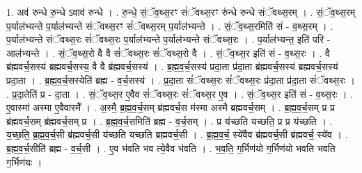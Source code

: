 \documentclass[17pt]{extarticle}
\begin{document}
1. अव॑ रुन्धे रु॒न्धे ऽवाव॑ रुन्धे । . रु॒न्धे॒ सं॒ॅव॒थ्स॒रꣳ सं॑ॅवथ्स॒रꣳ रु॑न्धे रुन्धे संॅवथ्स॒रम् । . सं॒ॅव॒थ्स॒रम् प॒र्याल॑भ्यन्ते प॒र्याल॑भ्यन्ते संॅवथ्स॒रꣳ सं॑ॅवथ्स॒रम् प॒र्याल॑भ्यन्ते । . सं॒ॅव॒थ्स॒रमिति॑ सं - व॒थ्स॒रम् । . प॒र्याल॑भ्यन्ते संॅवथ्स॒रः सं॑ॅवथ्स॒रः प॒र्याल॑भ्यन्ते प॒र्याल॑भ्यन्ते संॅवथ्स॒रः । . प॒र्याल॑भ्यन्त॒ इति॑ परि - आल॑भ्यन्ते । . सं॒ॅव॒थ्स॒रो वै वै सं॑ॅवथ्स॒रः सं॑ॅवथ्स॒रो वै । . सं॒ॅव॒थ्स॒र इति॑ सं - व॒थ्स॒रः । . वै ब्र॑ह्मवर्च॒सस्य॑ ब्रह्मवर्च॒सस्य॒ वै वै ब्र॑ह्मवर्च॒सस्य॑ । . ब्र॒ह्म॒व॒र्च॒सस्य॑ प्रदा॒ता प्र॑दा॒ता ब्र॑ह्मवर्च॒सस्य॑ ब्रह्मवर्च॒सस्य॑ प्रदा॒ता । . ब्र॒ह्म॒व॒र्च॒सस्येति॑ ब्रह्म - व॒र्च॒सस्य॑ । . प्र॒दा॒ता सं॑ॅवथ्स॒रः सं॑ॅवथ्स॒रः प्र॑दा॒ता प्र॑दा॒ता सं॑ॅवथ्स॒रः । . प्र॒दा॒तेति॑ प्र - दा॒ता । . सं॒ॅव॒थ्स॒र ए॒वैव सं॑ॅवथ्स॒रः सं॑ॅवथ्स॒र ए॒व । . सं॒ॅव॒थ्स॒र इति॑ सं - व॒थ्स॒रः । . ए॒वास्मा॑ अस्मा ए॒वैवास्मै᳚ । . अ॒स्मै॒ ब्र॒ह्म॒व॒र्च॒सम् ब्र॑ह्मवर्च॒स म॑स्मा अस्मै ब्रह्मवर्च॒सम् । . ब्र॒ह्म॒व॒र्च॒सम् प्र प्र ब्र॑ह्मवर्च॒सम् ब्र॑ह्मवर्च॒सम् प्र । . ब्र॒ह्म॒व॒र्च॒समिति॑ ब्रह्म - व॒र्च॒सम् । . प्र य॑च्छति यच्छति॒ प्र प्र य॑च्छति । . य॒च्छ॒ति॒ ब्र॒ह्म॒व॒र्च॒सी ब्र॑ह्मवर्च॒सी य॑च्छति यच्छति ब्रह्मवर्च॒सी । . ब्र॒ह्म॒व॒र्च॒ स्ये॑वैव ब्र॑ह्मवर्च॒सी ब्र॑ह्मवर्च॒ स्ये॑व । . ब्र॒ह्म॒व॒र्च॒सीति॑ ब्रह्म - व॒र्च॒सी । . ए॒व भ॑वति भव त्ये॒वैव भ॑वति । . भ॒व॒ति॒ ग॒र्भिण॑यो ग॒र्भिण॑यो भवति भवति ग॒र्भिण॑यः । \newline
\end{document}
